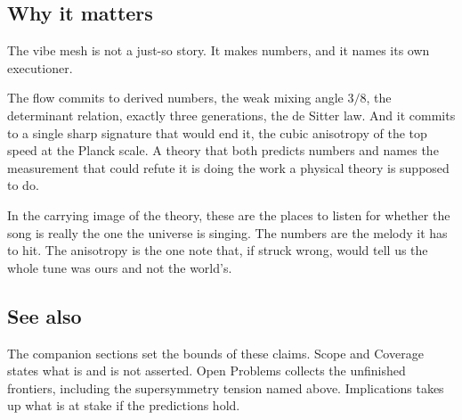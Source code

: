 \subsection{Why it matters}

The vibe mesh is not a just-so story. It makes numbers, and it names its own executioner.

\begin{result}
The flow commits to derived numbers, the weak mixing angle $3/8$, the determinant relation, exactly three generations, the de Sitter law. And it commits to a single sharp signature that would end it, the cubic anisotropy of the top speed at the Planck scale. A theory that both predicts numbers and names the measurement that could refute it is doing the work a physical theory is supposed to do.
\end{result}

In the carrying image of the theory, these are the places to listen for whether the song is really the one the universe is singing. The numbers are the melody it has to hit. The anisotropy is the one note that, if struck wrong, would tell us the whole tune was ours and not the world's.

\subsection{See also}

The companion sections set the bounds of these claims. Scope and Coverage states what is and is not asserted. Open Problems collects the unfinished frontiers, including the supersymmetry tension named above. Implications takes up what is at stake if the predictions hold.

